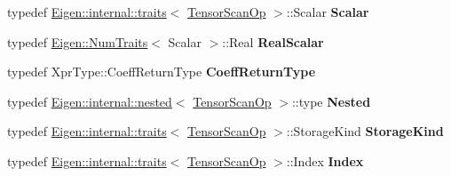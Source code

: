 \begin{DoxyCompactItemize}
typedef \hyperlink{struct_eigen_1_1internal_1_1traits}{Eigen\+::internal\+::traits}$<$ \hyperlink{class_eigen_1_1_tensor_scan_op}{Tensor\+Scan\+Op} $>$\+::Scalar {\bfseries Scalar}
\item 
\mbox{\label{class_eigen_1_1_tensor_scan_op_a8288bbf4fee44b48216a4f474e232cdb}} 
typedef \hyperlink{group___core___module_struct_eigen_1_1_num_traits}{Eigen\+::\+Num\+Traits}$<$ Scalar $>$\+::Real {\bfseries Real\+Scalar}
\item 
\mbox{\label{class_eigen_1_1_tensor_scan_op_a13b25e77a08992deabbd320172044e79}} 
typedef Xpr\+Type\+::\+Coeff\+Return\+Type {\bfseries Coeff\+Return\+Type}
\item 
\mbox{\label{class_eigen_1_1_tensor_scan_op_a1c30340cc47c0e0066f1daa24ee8a656}} 
typedef \hyperlink{struct_eigen_1_1internal_1_1nested}{Eigen\+::internal\+::nested}$<$ \hyperlink{class_eigen_1_1_tensor_scan_op}{Tensor\+Scan\+Op} $>$\+::type {\bfseries Nested}
\item 
\mbox{\label{class_eigen_1_1_tensor_scan_op_a291ad6ceb9b864bd67712e00efd5115f}} 
typedef \hyperlink{struct_eigen_1_1internal_1_1traits}{Eigen\+::internal\+::traits}$<$ \hyperlink{class_eigen_1_1_tensor_scan_op}{Tensor\+Scan\+Op} $>$\+::Storage\+Kind {\bfseries Storage\+Kind}
\item 
\mbox{\label{class_eigen_1_1_tensor_scan_op_abad0ac80094f927d232d462c0e38d67b}} 
typedef \hyperlink{struct_eigen_1_1internal_1_1traits}{Eigen\+::internal\+::traits}$<$ \hyperlink{class_eigen_1_1_tensor_scan_op}{Tensor\+Scan\+Op} $>$\+::Index {\bfseries Index}
\end{DoxyCompactItemize}
